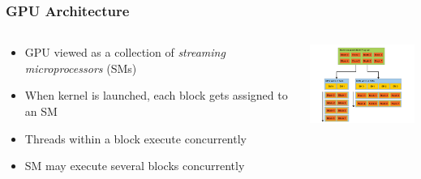 \documentclass[10pt]{beamer}
\begin{document}
\begin{frame}
\frametitle{GPU Architecture}
\begin{columns}
\begin{column}{0.5\textwidth}
\begin{itemize}
\item GPU viewed as a collection of \emph{streaming microprocessors} (SMs)
\item When kernel is launched, each block gets assigned to an SM
\item Threads within a block execute concurrently
\item SM may execute several blocks concurrently
\end{itemize}
\end{column}
\begin{column}{0.5\textwidth}
\includegraphics[width=150px]{img/gpu-scaling.png}
\end{column}
\end{columns}
\end{frame}
\end{document}
